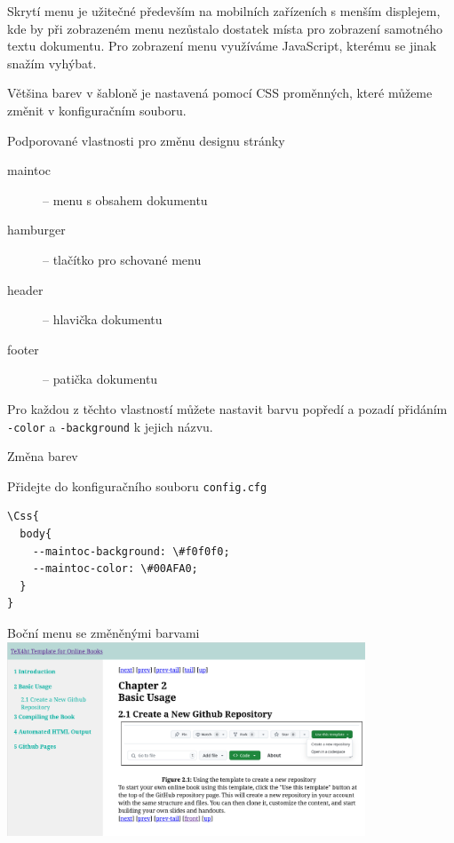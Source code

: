 Skrytí menu je užitečné především na mobilních zařízeních s menším displejem, kde by při 
zobrazeném menu nezůstalo dostatek místa pro zobrazení samotného textu dokumentu.
Pro zobrazení menu využíváme JavaScript, kterému se jinak snažím vyhýbat. 

Většina barev v šabloně je nastavená pomocí CSS proměnných, které můžeme změnit v konfiguračním souboru.

\begin{frame}[fragile]{Podporované vlastnosti pro změnu designu stránky}
  \begin{block}{}
    \begin{description}
      \item[maintoc] -- menu s obsahem dokumentu
      \item[hamburger] -- tlačítko pro schované menu
      \item[header] -- hlavička dokumentu
      \item[footer] -- patička dokumentu
    \end{description}
  \end{block}
  \begin{block}{}
    Pro každou z těchto vlastností můžete nastavit barvu popředí a pozadí přidáním \texttt{-color} a \texttt{-background} 
    k jejich názvu.
  \end{block}

\end{frame}

\begin{frame}[fragile]{Změna barev}

  \begin{block}{Přidejte do konfiguračního souboru \texttt{config.cfg}}
\begin{verbatim}
\Css{
  body{
    --maintoc-background: \#f0f0f0;
    --maintoc-color: \#00AFA0;
  }
}
\end{verbatim}
\end{block}

\begin{block}{Boční menu se změněnými barvami}
\includegraphics[width=0.8\textwidth]{img/book-changecolor.png}
\end{block}
\end{frame}


